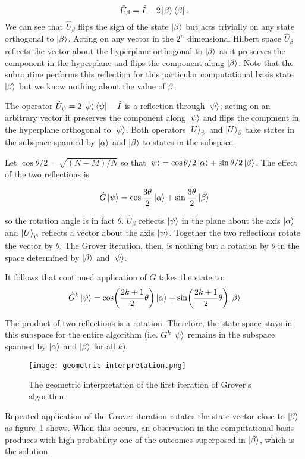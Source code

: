 \begin{equation}\label{eq:beta-projection}
    \hat{U}_\beta = \hat{I} - 2 \ket{\beta}\bra{\beta}.
\end{equation}
We can see that $\hat{U}_\beta$ flips the sign of the state $\ket{\beta}$ but acts trivially on any state orthogonal to $\ket{\beta}$. Acting on any vector in the $2^n$ dimensional Hilbert space $\hat{U}_\beta$  reflects the vector about the hyperplane orthogonal to $\ket{\beta}$ as it preserves the component in the hyperplane and flips the component along $\ket{\beta}$. Note that the subroutine performs this reflection for this particular computational basis state $\ket{\beta}$ but we know nothing about the value of $\beta$.

 The operator $\hat{U}_\psi = 2 \ket{\psi}\bra{\psi} - \hat{I}$ is a reflection through $\ket{\psi}$; acting on an arbitrary vector it preserves the component along $\ket{\psi}$ and flips the compment in the hyperplane orthogonal to $\ket{\psi}$. Both operators $\ket{U}_\psi$ and $\ket{U}_\beta$ take states in the subspace spanned by $\ket{\alpha}$ and $\ket{\beta}$ to states in the subspace. 
 
 Let $\cos\theta/2 = \sqrt{(N-M)/N}$ so that $\ket{\psi} = \cos\theta/2\ket{\alpha} + \sin\theta/2\ket{\beta}$.  The effect of the two reflections is
 
 \begin{equation*}
    \hat{G}\ket{\psi} = \cos\frac{3\theta}{2} \ket{\alpha} + \sin\frac{3\theta}{2} \ket{\beta}
\end{equation*}

so the rotation angle is in fact $\theta$. $\hat{U}_\beta$ reflects $\ket{\psi}$ in the plane about the axis $\ket{\alpha}$ and $\ket{U}_\psi$ reflects a vector about the axis $\ket{\psi}$. Together the two reflections rotate the vector by $\theta$. The Grover iteration, then, is nothing but a rotation by $\theta$ in the space determined by $\ket{\beta}$ and $\ket{\psi}$.

It follows that continued application of $G$ takes the state to:
\begin{equation*}
    \hat{G}^{k}\ket{\psi} = \cos\biggl(\frac{2k+1}{2}\theta\biggr) \ket{\alpha} + \sin\biggl(\frac{2k+1}{2}\theta\biggr) \ket{\beta}
\end{equation*}

The product of two reflections is a rotation. Therefore, the state space stays in this subspace for the entire algorithm (i.e. $G^k\ket{\psi}$ remains in the subspace spanned by $\ket{\alpha}$ and $\ket{\beta}$ for all $k$). 

\begin{figure}
\texttt{[image: geometric-interpretation.png]}
\centering
\caption{The geometric interpretation of the first iteration of Grover's algorithm.}
\label{fig:geometric-interpretation}
\end{figure}

Repeated application of the Grover iteration rotates the state vector close to $\ket{\beta}$ as figure~\ref{fig:geometric-interpretation} shows. When this occurs, an observation in the computational basis produces with high probability one of the outcomes superposed in $\ket{\beta}$, which is the solution.


